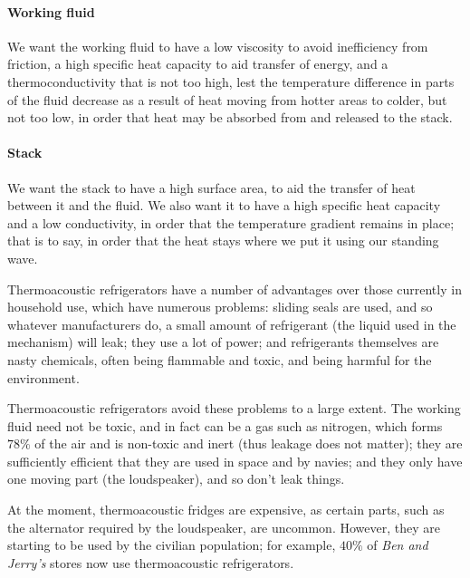 \begin{multicols}{2}
\paragraph{Working fluid} We want the working fluid to have a low viscosity to avoid inefficiency from friction, a high specific heat capacity to aid transfer of energy, and a thermoconductivity that is not too high, lest the temperature difference in parts of the fluid decrease as a result of heat moving from hotter areas to colder, but not too low, in order that heat may be absorbed from and released to the stack.

\paragraph{Stack} We want the stack to have a high surface area, to aid the transfer of heat between it and the fluid. We also want it to have a high specific heat capacity and a low conductivity, in order that the temperature gradient remains in place; that is to say, in order that the heat stays where we put it using our standing wave.

Thermoacoustic refrigerators have a number of advantages over those currently in household use, which have numerous problems: sliding seals are used, and so whatever manufacturers do, a small amount of refrigerant (the liquid used in the mechanism) will leak; they use a lot of power; and refrigerants themselves are nasty chemicals, often being flammable and toxic, and being harmful for the environment.

Thermoacoustic refrigerators avoid these problems to a large extent. The working fluid need not be toxic, and in fact can be a gas such as nitrogen, which forms \(78\%\) of the air and is non-toxic and inert (thus leakage does not matter); they are sufficiently efficient that they are used in space and by navies; and they only have one moving part (the loudspeaker), and so don't leak things.

At the moment, thermoacoustic fridges are expensive, as certain parts, such as the alternator required by the loudspeaker, are uncommon. However, they are starting to be used by the civilian population; for example, \(40\%\) of \textit{Ben and Jerry's} stores now use thermoacoustic refrigerators.
\end{multicols}